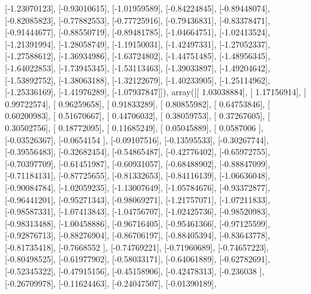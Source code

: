 \documentclass{article}
\begin{document}
       [-1.23070123],
       [-0.93010615],
       [-1.01959589],
       [-0.84224845],
       [-0.89448074],
       [-0.82085823],
       [-0.77882553],
       [-0.77725916],
       [-0.79436831],
       [-0.83378471],
       [-0.91444677],
       [-0.88550719],
       [-0.89481785],
       [-1.04664751],
       [-1.02413524],
       [-1.21391994],
       [-1.28058749],
       [-1.19150031],
       [-1.42497331],
       [-1.27052337],
       [-1.27588612],
       [-1.36934986],
       [-1.63724802],
       [-1.44751485],
       [-1.48956345],
       [-1.64022853],
       [-1.73945345],
       [-1.53113463],
       [-1.39033897],
       [-1.49204642],
       [-1.53892752],
       [-1.38063188],
       [-1.32122679],
       [-1.40233905],
       [-1.25114962],
       [-1.25336169],
       [-1.41976289],
       [-1.07937847]]), array([[ 1.03038884],
       [ 1.17156914],
       [ 0.99722574],
       [ 0.96259658],
       [ 0.91833289],
       [ 0.80855982],
       [ 0.64753846],
       [ 0.60200983],
       [ 0.51670667],
       [ 0.44706032],
       [ 0.38059753],
       [ 0.37267605],
       [ 0.30502756],
       [ 0.18772095],
       [ 0.11685249],
       [ 0.05045889],
       [ 0.0587006 ],
       [-0.03526367],
       [-0.0654154 ],
       [-0.09107516],
       [-0.13595533],
       [-0.30267744],
       [-0.39556483],
       [-0.32682454],
       [-0.54865487],
       [-0.42776402],
       [-0.65972755],
       [-0.70397709],
       [-0.61451987],
       [-0.60931057],
       [-0.68488902],
       [-0.88847099],
       [-0.71184131],
       [-0.87725655],
       [-0.81332653],
       [-0.84116139],
       [-1.06636048],
       [-0.90084784],
       [-1.02059235],
       [-1.13007649],
       [-1.05784676],
       [-0.93372877],
       [-0.96441201],
       [-0.95271343],
       [-0.98069271],
       [-1.21757071],
       [-1.07211833],
       [-0.98587331],
       [-1.07413843],
       [-1.04756707],
       [-1.02425736],
       [-0.98520983],
       [-0.98313488],
       [-1.00458886],
       [-0.96716405],
       [-0.95461366],
       [-0.97125599],
       [-0.92876713],
       [-0.88276904],
       [-0.86706197],
       [-0.88405394],
       [-0.83643778],
       [-0.81735418],
       [-0.7668552 ],
       [-0.74769221],
       [-0.71960689],
       [-0.74657223],
       [-0.80498525],
       [-0.61977902],
       [-0.58033171],
       [-0.64061889],
       [-0.62782691],
       [-0.52345322],
       [-0.47915156],
       [-0.45158906],
       [-0.42478313],
       [-0.236038  ],
       [-0.26709978],
       [-0.11624463],
       [-0.24047507],
       [-0.01390189],
\end{document}
